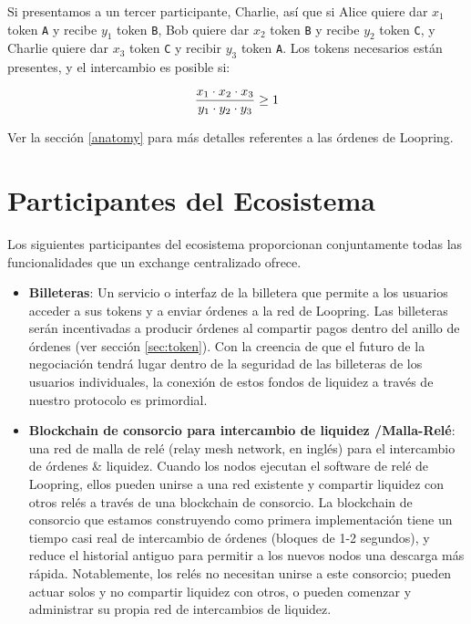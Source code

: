 \documentclass[UTF8,nofonts]{article}
\begin{document}
\begin{multicols}{2}
Si presentamos a un tercer participante, Charlie, as\'i que si Alice quiere dar $x_1$ token \verb|A| y recibe $y_1$ token \verb|B|, Bob quiere dar $x_2$ token \verb|B| y recibe $y_2$ token \verb|C|, y Charlie quiere dar $x_3$ token \verb|C| y recibir $y_3$ token \verb|A|. Los tokens necesarios est\'an presentes, y el intercambio es posible si:

\begin{equation}
{{x_1 \cdot x_2 \cdot x_3 \over y_1 \cdot y_2 \cdot y_3} \geq 1}
\end{equation}



Ver la secci\'on \ref{anatomy} para m\'as detalles referentes a las \'ordenes de Loopring.

\section{Participantes del Ecosistema\label{sec:ecosystem}}
Los siguientes participantes del ecosistema proporcionan conjuntamente todas las funcionalidades que un exchange centralizado ofrece.
\begin{itemize}


\item \textbf{Billeteras}: Un servicio o interfaz de la billetera que permite a los usuarios acceder a sus tokens y a enviar \'ordenes a la red de Loopring. Las billeteras ser\'an incentivadas a producir \'ordenes al compartir pagos dentro del anillo de \'ordenes (ver secci\'on \ref{sec:token}). Con la creencia de que el futuro de la negociaci\'on tendr\'a lugar dentro de la seguridad de las billeteras de los usuarios individuales, la conexi\'on de estos fondos de liquidez a trav\'es de nuestro protocolo es primordial.

\item \textbf {Blockchain de consorcio para  intercambio de liquidez /Malla-Rel\'e}: una red de malla de rel\'e (relay mesh network, en ingl\'es) para el intercambio de \'ordenes \& liquidez. Cuando los nodos ejecutan el software de rel\'e de Loopring, ellos pueden unirse a una red existente y compartir liquidez con otros rel\'es a trav\'es de una blockchain de consorcio. La blockchain de consorcio que estamos construyendo como primera implementaci\'on tiene un tiempo casi real de intercambio de \'ordenes (bloques de 1-2 segundos), y reduce el historial antiguo para permitir a los nuevos nodos una descarga m\'as r\'apida. Notablemente, los rel\'es no necesitan unirse a este consorcio; pueden actuar solos y no compartir liquidez con otros, o pueden comenzar y administrar su propia red de intercambios de liquidez.


\end{itemize}
\end{multicols}
\end{document}

